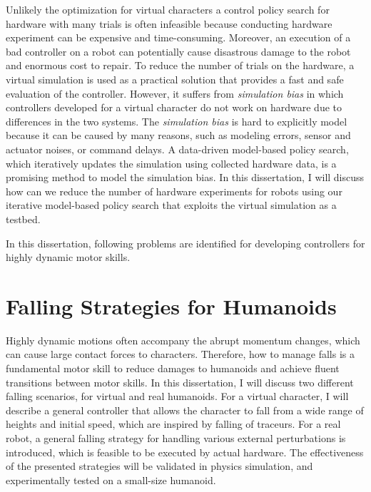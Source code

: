 Unlikely the optimization for virtual characters
a control policy search for hardware with many trials is often infeasible
because conducting hardware experiment can be expensive and time-consuming.
Moreover, an execution of a bad controller on a robot can potentially cause
disastrous damage to the robot and enormous cost to repair.
To reduce the number of trials on the hardware, a virtual simulation 
is used as a practical solution that provides a fast and safe evaluation
of the controller.
However, it suffers from \emph{simulation bias} in which
controllers developed for a virtual character do not work on hardware due
to differences in the two systems.
The \emph{simulation bias} is hard to explicitly model because it can
be caused by many reasons, such as modeling errors, sensor and actuator noises,
or command delays.
A data-driven model-based policy search, which iteratively updates the simulation
using collected hardware data, is a promising method to 
model the simulation bias.
In this dissertation, I will discuss how can we reduce the number of hardware
experiments for robots using our iterative model-based policy search that
exploits the virtual simulation as a testbed.

In this dissertation, following problems are identified for developing 
controllers for highly dynamic motor skills.

\section{Falling Strategies for Humanoids}
Highly dynamic motions often accompany the abrupt momentum changes, which can
cause large contact forces to characters.
Therefore, how to manage falls is a fundamental motor skill to reduce damages
to humanoids and achieve fluent transitions between motor skills.
In this dissertation, I will discuss two different falling scenarios, 
for  virtual and real humanoids.
For a virtual character, I will describe a general controller that allows the character to fall from a wide range of heights and initial speed,
which are inspired by falling of traceurs.
For a real robot, a general falling strategy for handling various 
external perturbations is introduced, which is feasible to be
executed by actual hardware.
The effectiveness of the presented strategies will be validated in physics
simulation, and experimentally tested on a small-size humanoid.

